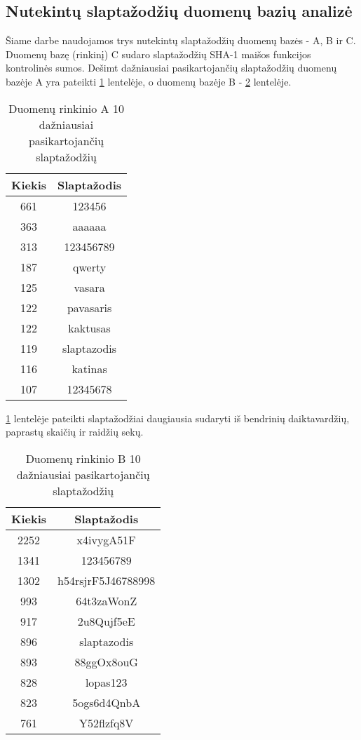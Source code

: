 \documentclass{VUMIFInfBakalaurinis}
\begin{document}
\subsection{Nutekintų slaptažodžių duomenų bazių analizė}
Šiame darbe naudojamos trys nutekintų slaptažodžių duomenų bazės - A, B ir C. 
Duomenų bazę (rinkinį) C sudaro slaptažodžių SHA-1 maišos funkcijos kontrolinės 
sumos. Dešimt dažniausiai pasikartojančių slaptažodžių duomenų bazėje A yra 
pateikti \ref{10-dazn-slapt-a} lentelėje, o duomenų bazėje B - 
\ref{10-dazn-slapt-b} lentelėje.

\begin{table}[hb]
\centering
\begin{tabular}{|c|c|}
  \hline
  Kiekis & Slaptažodis \\
  \hline
  661 & 123456 \\
  363 & aaaaaa \\
  313 & 123456789 \\
  187 & qwerty \\
  125 & vasara \\
  122 & pavasaris \\
  122 & kaktusas \\
  119 & slaptazodis \\
  116 & katinas \\
  107 & 12345678 \\
  \hline
\end{tabular}
\caption{Duomenų rinkinio A 10 dažniausiai pasikartojančių slaptažodžių}
\label{10-dazn-slapt-a}
\end{table}

\ref{10-dazn-slapt-a} lentelėje pateikti slaptažodžiai daugiausia sudaryti iš 
bendrinių daiktavardžių, paprastų skaičių ir raidžių sekų.

\begin{table}[ht]
\centering
\begin{tabular}{|c|c|}
  \hline
  Kiekis & Slaptažodis \\
  \hline
  2252 & x4ivygA51F \\
  1341 & 123456789 \\
  1302 & h54rsjrF5J46788998 \\
  993 & 64t3zaWonZ \\
  917 & 2u8Qujf5eE \\
  896 & slaptazodis \\
  893 & 88ggOx8ouG \\
  828 & lopas123 \\
  823 & 5ogs6d4QnbA \\
  761 & Y52flzfq8V \\
  \hline
\end{tabular}
\caption{Duomenų rinkinio B 10 dažniausiai pasikartojančių slaptažodžių}
\label{10-dazn-slapt-b}
\end{table}
\end{document}
